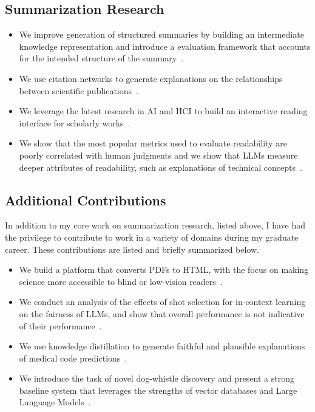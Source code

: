 \subsection{Summarization Research}
\begin{itemize}
    \item We improve generation of structured summaries by building an intermediate knowledge representation and introduce a evaluation framework that accounts for the intended structure of the summary~\cite[][]{cachola-etal-2024-knowledge}.
    \item We use citation networks to generate explanations on the relationships between scientific publications~\cite{luu-etal-2021-explaining}.
    \item We leverage the latest research in AI and HCI to build an interactive reading interface for scholarly works~\cite{semantic-reader-project}.
    \item We show that the most popular metrics used to evaluate readability are poorly correlated with human judgments and we show that LLMs measure deeper attributes of readability, such as explanations of technical concepts~\cite[][]{cachola-etal-2025-evaluating}. 

\end{itemize}
\subsection{Additional Contributions}
In addition to my core work on summarization research, listed above, I have had the privilege to contribute to work in a variety of domains during my graduate career. These contributions are listed and briefly summarized below.
\begin{itemize}
    \item We build a platform that converts PDFs to HTML, with the focus on making science more accessible to blind or low-vision readers~\cite{wang-cachola-scially}. {\small {}}
    \item We conduct an analysis of the effects of shot selection for in-context learning on the fairness of LLMs, and show that overall performance is not indicative of their performance~\cite{aguirre-etal-2024-selecting}.
    \item We use knowledge distillation to generate faithful and plausible explanations of medical code predictions~\cite{wood-doughty-etal-2022-model}.
    \item We introduce the task of novel dog-whistle discovery and present a strong baseline system that leverages the strengths of vector databases and Large Language Models~\cite{sasse-etal-2025-making}.
\end{itemize}

